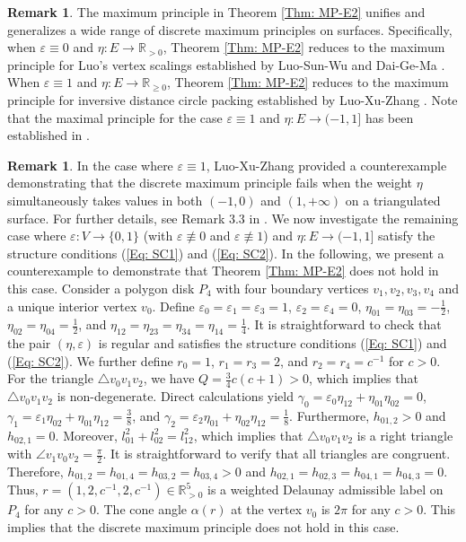 \documentclass[12pt]{amsart}
\theoremstyle{definition}
\newtheorem{remark}[theorem]{Remark}
\begin{document}
\begin{remark}
The maximum principle in Theorem \ref{Thm: MP-E2} unifies and generalizes a wide range of discrete maximum principles on surfaces.  
Specifically, when $\varepsilon\equiv0$ and $\eta: E\rightarrow \mathbb{R}_{>0}$,  
Theorem \ref{Thm: MP-E2} reduces to the maximum principle for Luo's vertex scalings established by Luo-Sun-Wu \cite{LSW} and Dai-Ge-Ma \cite{DGM}.  
When $\varepsilon\equiv1$ and $\eta: E\rightarrow \mathbb{R}_{\geq0}$,  
Theorem \ref{Thm: MP-E2} reduces to the maximum principle for inversive distance circle packing established by Luo-Xu-Zhang \cite{LXZ}.  
Note that the maximal principle for the case $\varepsilon\equiv1$ and $\eta: E\rightarrow (-1,1]$ has been established in \cite{LXZ}.
\end{remark}

\begin{remark}
In the case where $\varepsilon\equiv1$, Luo-Xu-Zhang \cite{LXZ} provided a counterexample demonstrating that the discrete maximum principle fails when the weight $\eta$ simultaneously takes values in both $(-1,0)$ and $(1,+\infty)$ on a triangulated surface.  
For further details, see Remark 3.3 in \cite{LXZ}. 
We now investigate the remaining case where $\varepsilon: V\rightarrow \{0,1\}$ (with $\varepsilon\not\equiv0$ and $\varepsilon\not\equiv1$) and $\eta: E\rightarrow (-1,1]$ satisfy the structure conditions (\ref{Eq: SC1}) and (\ref{Eq: SC2}).  
In the following, we present a counterexample to demonstrate that Theorem \ref{Thm: MP-E2} does not hold in this case.  
Consider a polygon disk $P_4$ with four boundary vertices $v_1, v_2, v_3, v_4$ and a unique interior vertex $v_0$.  
Define $\varepsilon_0=\varepsilon_1=\varepsilon_3=1$,  
$\varepsilon_2=\varepsilon_4=0$,  
$\eta_{01}=\eta_{03}=-\frac{1}{2}$,  
$\eta_{02}=\eta_{04}=\frac{1}{2}$,  
and $\eta_{12}=\eta_{23}=\eta_{34}=\eta_{14}=\frac{1}{4}$.  
It is straightforward to check that the pair $(\eta,\varepsilon)$ is regular and satisfies the structure conditions (\ref{Eq: SC1}) and (\ref{Eq: SC2}).
We further define $r_0=1$, $r_1=r_3=2$, and $r_2=r_4=c^{-1}$ for $c>0$.  
For the triangle $\triangle v_0v_1v_2$, we have $Q=\frac{3}{4}c(c+1)>0$,  
which implies that $\triangle v_0v_1v_2$ is non-degenerate.  
Direct calculations yield  
$\gamma_0=\varepsilon_0\eta_{12}+\eta_{01}\eta_{02}=0$,  
$\gamma_1=\varepsilon_1\eta_{02}+\eta_{01}\eta_{12}=\frac{3}{8}$,  
and $\gamma_2=\varepsilon_2\eta_{01}+\eta_{02}\eta_{12}=\frac{1}{8}$.  
Furthermore, $h_{01,2}>0$ and $h_{02,1}=0$.  
Moreover, $l_{01}^2+l_{02}^2=l_{12}^2$,  
which implies that $\triangle v_0v_1v_2$ is a right triangle with $\angle v_1v_0v_2=\frac{\pi}{2}$.  
It is straightforward to verify that all triangles are congruent.  
Therefore,  
$h_{01,2}=h_{01,4}=h_{03,2}=h_{03,4}>0$ and  
$h_{02,1}=h_{02,3}=h_{04,1}=h_{04,3}=0$.  
Thus,  
$r=(1,2,c^{-1},2,c^{-1})\in \mathbb{R}^5_{>0}$ is a weighted Delaunay admissible label on $P_4$ for any $c>0$.  
The cone angle $\alpha(r)$ at the vertex $v_0$ is $2\pi$ for any $c>0$.  
This implies that the discrete maximum principle does not hold in this case.
\end{remark}
\end{document}
